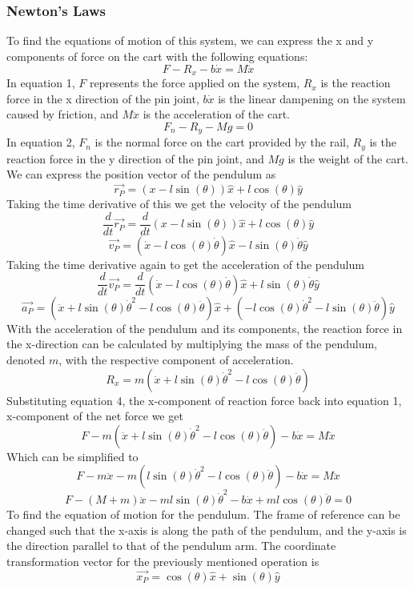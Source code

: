 \documentclass{article}
\begin{document}
\subsubsection{Newton's Laws}
To find the equations of motion of this system, we can express the x and y components 
of force on the cart with the following equations:
\[F-R_x-b\dot{x}=M\ddot{x} \tag{1}\]
In equation 1, $F$ represents the force applied on the system, $R_x$ is the reaction
force in the x direction of the pin joint, $b\dot{x}$ is the linear dampening on the system caused by friction,
and $M\ddot{x}$ is the acceleration of the cart.
\[F_n-R_y-Mg=0 \tag{2}\]
In equation 2, $F_n$ is the normal force on the cart provided by the rail, $R_y$
is the reaction force in the y direction of the pin joint, and $Mg$ is the weight 
of the cart.
\\
We can express the position vector of the pendulum as
\[\vec{r_P}=(x-l\sin(\theta))\hat{x}+l\cos(\theta)\hat{y}\]
Taking the time derivative of this we get the velocity of the pendulum
\[\frac{d}{dt}\vec{r_P}=\frac{d}{dt}(x-l\sin(\theta))\hat{x}+l\cos(\theta)\hat{y}\]
\[\vec{v_P}=(\dot{x}-l\cos(\theta)\dot{\theta})\hat{x}-l\sin(\theta)\dot{\theta}\hat{y}\]
Taking the time derivative again to get the acceleration of the pendulum
\[\frac{d}{dt}\vec{v_P}=\frac{d}{dt}(\dot{x}-l\cos(\theta)\dot{\theta})\hat{x}+l\sin(\theta)\dot{\theta}\hat{y}\]
\[\vec{a_P}=(\ddot{x}+l\sin(\theta)\dot{\theta}^2-l\cos(\theta)\ddot{\theta})\hat{x}+(-l\cos(\theta)\dot{\theta}^2-l\sin(\theta)\ddot{\theta})\hat{y} \tag{3}\]
With the acceleration of the pendulum and its components, the reaction force in the 
x-direction can be calculated by multiplying the mass of the pendulum, denoted
$m$, with the respective component of acceleration.
\[R_x=m(\ddot{x}+l\sin(\theta)\dot{\theta}^2-l\cos(\theta)\ddot{\theta}) \tag{4}\]
Substituting equation 4, the x-component of reaction force back into equation 1, x-component of the 
net force we get
\[F-m(\ddot{x}+l\sin(\theta)\dot{\theta}^2-l\cos(\theta)\ddot{\theta})-b\dot{x}=M\ddot{x}\]
Which can be simplified to 
\[F-m\ddot{x}-m(l\sin(\theta)\dot{\theta}^2-l\cos(\theta)\ddot{\theta})-b\dot{x}=M\ddot{x}\]
\[F-(M+m)\ddot{x}-ml\sin(\theta)\dot{\theta}^2-b\dot{x}+ml\cos(\theta)\ddot{\theta}=0 \tag{5}\]
To find the equation of motion for the pendulum. The frame of reference can be changed such that the x-axis is along 
the path of the pendulum, and the y-axis is the direction parallel to that of the pendulum arm. The coordinate transformation vector
for the previously mentioned operation is
\[\vec{x_P}=\cos(\theta)\hat{x}+\sin(\theta)\hat{y}\]
\end{document}
